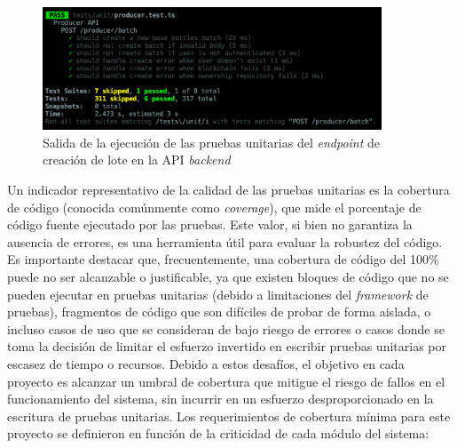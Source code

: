\begin{figure}[!htb]
	\centering
	\includegraphics[width=0.9\textwidth]{Figures/unit-test-api-results.png}
	\caption{Salida de la ejecución de las pruebas unitarias del \textit{\gls{endpoint}} de creación de lote en la API \textit{backend}}
	\label{fig:unit-test-api-results}
\end{figure}

Un indicador representativo de la calidad de las pruebas unitarias es la cobertura de código (conocida comúnmente como \textit{\gls{coverage}}), que mide el porcentaje de código fuente ejecutado por las pruebas. Este valor, si bien no garantiza la ausencia de errores, es una herramienta útil para evaluar la robustez del código. Es importante destacar que, frecuentemente, una cobertura de código del 100\% puede no ser alcanzable o justificable, ya que existen bloques de código que no se pueden ejecutar en pruebas unitarias (debido a limitaciones del \textit{framework} de pruebas), fragmentos de código que son difíciles de probar de forma aislada, o incluso casos de uso que se consideran de bajo riesgo de errores o casos donde se toma la decisión de limitar el esfuerzo invertido en escribir pruebas unitarias por escasez de tiempo o recursos. Debido a estos desafíos, el objetivo en cada proyecto es alcanzar un umbral de cobertura que mitigue el riesgo de fallos en el funcionamiento del sistema, sin incurrir en un esfuerzo desproporcionado en la escritura de pruebas unitarias. Los requerimientos de cobertura mínima para este proyecto se definieron en función de la criticidad de cada módulo del sistema:


